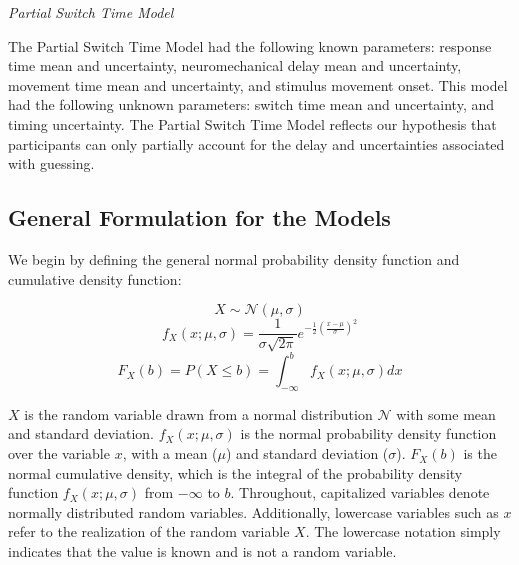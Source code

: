 \documentclass[man,floatsintext,letterpaper,12pt]{apa7}
\begin{document}
\vspace{2mm}
\noindent \emph{Partial Switch Time Model}

\noindent The Partial Switch Time Model had the following known parameters: response time mean and uncertainty, neuromechanical delay mean and uncertainty, movement time mean and uncertainty, and stimulus movement onset. This model had the following unknown parameters: switch time mean and uncertainty, and timing uncertainty. The Partial Switch Time Model reflects our hypothesis that participants can only partially account for the delay and uncertainties associated with guessing.

\vspace{2mm}
\subsection{General Formulation for the Models}

\noindent We begin by defining the general normal probability density function and cumulative density function:
\setlength{\belowdisplayskip}{4pt} \setlength{\belowdisplayshortskip}{4pt} %
\setlength{\abovedisplayskip}{4pt} \setlength{\abovedisplayshortskip}{4pt}

\setcounter{equation}{0}

\begin{equation}
    X\sim\mathcal{N}(\mu,\sigma)
\end{equation}
\begin{equation}
    f_{X}(x; \mu, \sigma) = \frac{1}{\sigma\sqrt{2\pi}}e^{-\frac{1}{2}(\frac{x-\mu}{\sigma})^2}
\end{equation}
\begin{equation}
    F_{X}(b) = P(X \leq b) = \int_{-\infty}^{b} f_{X}(x; \mu, \sigma)dx
\end{equation}

$X$ is the random variable drawn from a normal distribution $\mathcal{N}$ with some mean and standard deviation. $f_{X}(x;\mu,\sigma)$ is the normal probability density function over the variable $x$, with a mean ($\mu$) and standard deviation ($\sigma$). $F_{X}(b)$ is the normal cumulative density, which is the integral of the probability density function $f_{X}(x;\mu,\sigma)$ from $-\infty$ to $b$. Throughout, capitalized variables denote normally distributed random variables. Additionally, lowercase variables such as $x$ refer to the realization of the random variable $X$. The lowercase notation simply indicates that the value is known and is not a random variable.
\end{document}
